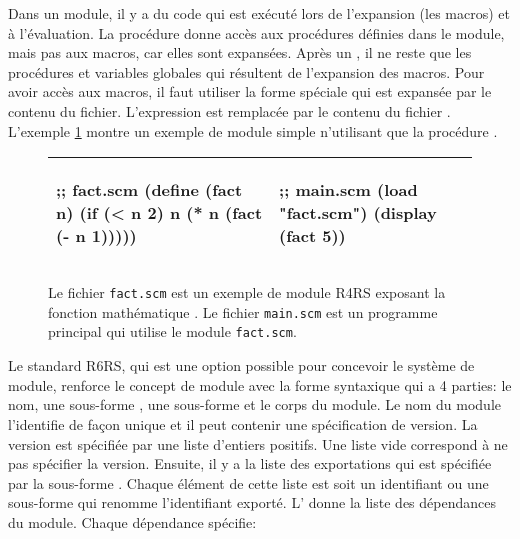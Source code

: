 Dans un module, il y a du code qui est exécuté lors de l'expansion (les macros)
et à l'évaluation. La procédure  donne accès aux procédures définies
dans le module, mais pas aux macros, car elles sont expansées.  Après un
, il ne reste que les procédures et variables globales qui
résultent de l'expansion des macros.  Pour avoir accès aux macros, il faut
utiliser la forme spéciale  qui est expansée par le contenu du
fichier.  L'expression  est remplacée par le
contenu du fichier . L'exemple \ref{fig:r4rs_fact} montre un
exemple de module simple n'utilisant que la procédure .

\begin{figure}[ht]
  \begin{center}
    \begin{tabular}{|l|l|}
    \hline
    \begin{mplisting}{0.4}
;; fact.scm
(define (fact n)
  (if (< n 2)
    n
    (* n (fact (- n 1)))))
\end{mplisting} &
    \begin{mplisting}{0.4}
;; main.scm
(load "fact.scm")
(display (fact 5))
\end{mplisting} \\\hline
    \end{tabular}
  \end{center}

  \caption{Le fichier \texttt{fact.scm} est un exemple de module R4RS exposant
  la fonction mathématique . Le fichier \texttt{main.scm} est un
  programme principal qui utilise le module \texttt{fact.scm}.}
  \label{fig:r4rs_fact}
\end{figure}



Le standard R6RS\cite{Scheme:R6RS}, qui est une option possible pour concevoir
le système de module, renforce le concept de module avec la forme syntaxique
 qui a 4 parties: le nom, une sous-forme , une
sous-forme  et le corps du module. Le nom du module l'identifie
de façon unique et il peut contenir une spécification de version. La version
est spécifiée par une liste d'entiers positifs. Une liste vide \lstcode{()}
correspond à ne pas spécifier la version. Ensuite, il y a la liste des
exportations qui est spécifiée par la sous-forme . Chaque
élément de cette liste est soit un identifiant ou une sous-forme
 qui renomme l'identifiant exporté.  L' donne
la liste des dépendances du module. Chaque dépendance spécifie:

